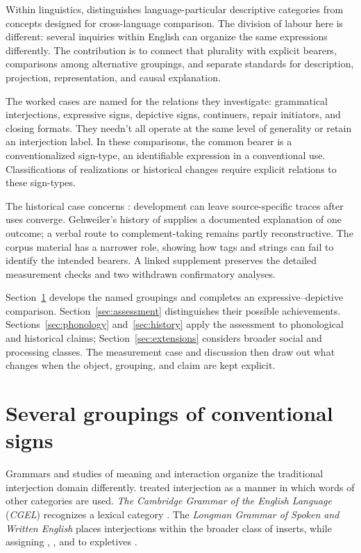 \documentclass[12pt]{article}
\begin{document}
Within linguistics, \textcite[663, 666, 680]{haspelmath2010} distinguishes
language-particular descriptive categories from concepts designed for
cross-language comparison. The division of labour here is different:
several inquiries within English can organize the same expressions
differently. The contribution is to connect that plurality with explicit
bearers, comparisons among alternative groupings, and separate standards
for description, projection, representation, and causal explanation.

The worked cases are named for the relations they investigate: grammatical
interjections, expressive signs, depictive signs, continuers, repair
initiators, and closing formats. They needn't all operate at the same level
of generality or retain an interjection label. In these comparisons, the
common bearer is a conventionalized sign-type, an identifiable expression
in a conventional use. Classifications of realizations or historical
changes require explicit relations to these sign-types.

The historical case concerns : development can leave
source-specific traces after uses converge. Gehweiler's history of
 supplies a documented explanation of one outcome; a verbal
route to complement-taking  remains partly reconstructive.
The corpus material has a narrower role, showing how tags and strings
can fail to identify the intended bearers. A linked supplement preserves
the detailed measurement checks and two withdrawn confirmatory analyses.

Section~\ref{sec:worked} develops the named groupings and completes an
expressive--depictive comparison. Section~\ref{sec:assessment} distinguishes
their possible achievements. Sections~\ref{sec:phonology} and~\ref{sec:history}
apply the assessment to phonological and historical claims;
Section~\ref{sec:extensions} considers broader social and processing
classes. The measurement case and discussion then draw out what changes
when the object, grouping, and claim are kept explicit.

\section{Several groupings of conventional signs}\label{sec:worked}

Grammars and studies of meaning and interaction organize the traditional
interjection domain differently. \textcite[90]{jespersen1924} treated
interjection as a manner in which words of other categories are used.
\textit{The Cambridge Grammar of the English Language} (\textit{CGEL})
recognizes a lexical category \citep[22]{HuddlestonPullum2002}. The
\textit{Longman Grammar of Spoken and Written English} places interjections
within the broader class of inserts, while assigning ,
, and  to expletives
\citep[1082--1083, 1094--1095]{Biber1999}.
\end{document}
